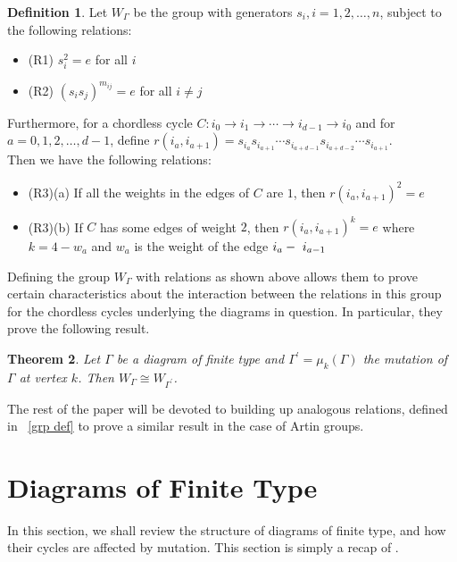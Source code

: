 \documentclass[11pt]{amsart}
\newtheorem{thm}{Theorem}[section]
\theoremstyle{definition}
\newtheorem{defn}[thm]{Definition}
\begin{document}
\begin{defn}
Let $W_{\Gamma}$ be the group with generators $s_i, i = 1,2,\ldots, n$, subject to the following relations:
\begin{itemize}
\item{(R1)} $s_i^2 = e$ for all $i$
\item{(R2)} $\left(s_is_j\right)^{m_{ij}} = e$ for all $i \neq j$
\end{itemize}
Furthermore, for a chordless cycle $C : i_0 \rightarrow i_1 \rightarrow \cdots \rightarrow i_{d-1} \rightarrow i_0$ and for $a = 0,1,2,\ldots, d-1$, define \textbf{$r\left(i_a, i_{a+1}\right) = s_{i_a}s_{i_{a+1}} \cdots s_{i_{a+d-1}}s_{i_{a+d-2}} \cdots s_{i_{a+1}}$}.\\

\vspace{0.1cm}
Then we have the following relations:
\begin{itemize}
\item{(R3)(a)} If all the weights in the edges of $C$ are $1$, then $r(i_a, i_{a+1})^2 = e$
\item{(R3)(b)} If $C$ has some edges of weight $2$, then $r(i_a, i_{a+1})^k = e$ where $k = 4-w_a$ and $w_a$ is the weight of the edge $i_a\--\ i_{a-1}$
\end{itemize}
\end{defn}

Defining the group $W_{\Gamma}$ with relations as shown above allows them to prove certain characteristics about the interaction between the relations in this group for the chordless cycles underlying the diagrams in question. In particular, they prove the following result.
\begin{thm}\cite[Theorem 5.4a]{BM13}
Let $\Gamma$ be a diagram of finite type and $\Gamma^{\prime} = \mu_k(\Gamma)$ the mutation of $\Gamma$ at vertex $k$. Then $W_{\Gamma} \cong W_{\Gamma^{\prime}}$.
\end{thm}

The rest of the paper will be devoted to building up analogous relations, defined in ~\ref{grp def} to prove a similar result in the case of Artin groups.


\section{Diagrams of Finite Type}
\label{sec:finite-type_diagrams}

In this section, we shall review the structure of diagrams of finite type, and how their cycles are affected by mutation. This section is simply a recap of \cite[Section 2]{BM13}.
\end{document}
